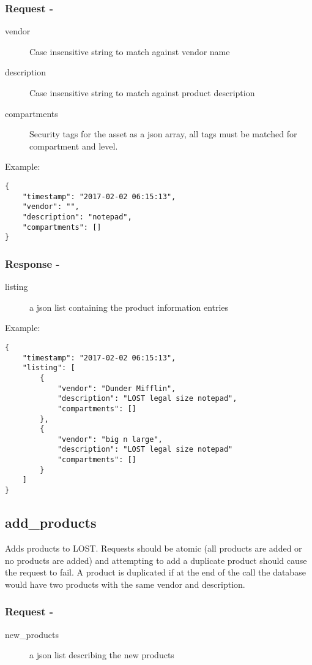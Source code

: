 \subsubsection*{Request -}
\begin{description}
\item[vendor] Case insensitive string to match against vendor name
\item[description] Case insensitive string to match against product description
\item[compartments] Security tags for the asset as a json array, all tags must be matched for compartment and level.
\end{description}

\noindent Example:
\begin{verbatim}
{
    "timestamp": "2017-02-02 06:15:13",
    "vendor": "",
    "description": "notepad",
    "compartments": []
}
\end{verbatim}

\subsubsection*{Response -}
\begin{description}
\item[listing] a json list containing the product information entries
\end{description}

\noindent Example:
\begin{verbatim}
{
    "timestamp": "2017-02-02 06:15:13",
    "listing": [
        {
            "vendor": "Dunder Mifflin",
            "description": "LOST legal size notepad",
            "compartments": []
        },
        {
            "vendor": "big n large",
            "description": "LOST legal size notepad"
            "compartments": []
        }
    ]
}
\end{verbatim}

\subsection*{add\_products}
Adds products to LOST. Requests should be atomic (all products are added or no products are added) and attempting to add a duplicate product should cause the request to fail. A product is duplicated if at the end of the call the database would have two products with the same vendor and description.
\\

\subsubsection*{Request -}
\begin{description}
\item[new\_products] a json list describing the new products
\end{description}


